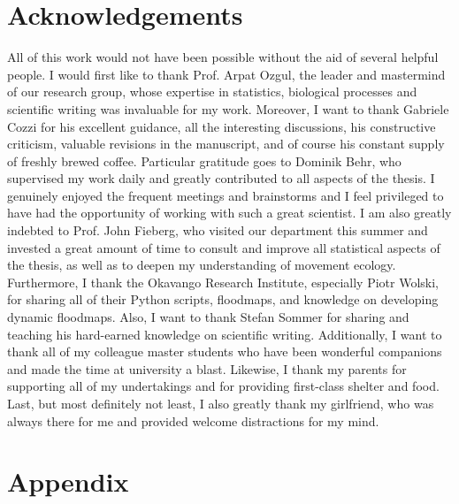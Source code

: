 \documentclass[abstract=on,10pt,a4paper,bibliography=totocnumbered]{scrartcl}
\begin{document}
\section{Acknowledgements}
All of this work would not have been possible without the aid of several helpful
people. I would first like to thank Prof. Arpat Ozgul, the leader and mastermind
of our research group, whose expertise in statistics, biological processes and
scientific writing was invaluable for my work. Moreover, I want to thank
Gabriele Cozzi for his excellent guidance, all the interesting discussions, his
constructive criticism, valuable revisions in the manuscript, and of course his
constant supply of freshly brewed coffee. Particular gratitude goes to Dominik
Behr, who supervised my work daily and greatly contributed to all aspects of the
thesis. I genuinely enjoyed the frequent meetings and brainstorms and I feel
privileged to have had the opportunity of working with such a great scientist. I
am also greatly indebted to Prof. John Fieberg, who visited our department this
summer and invested a great amount of time to consult and improve all
statistical aspects of the thesis, as well as to deepen my understanding of
movement ecology. Furthermore, I thank the Okavango Research Institute,
especially Piotr Wolski, for sharing all of their Python scripts, floodmaps, and
knowledge on developing dynamic floodmaps. Also, I want to thank Stefan Sommer
for sharing and teaching his hard-earned knowledge on scientific writing.
Additionally, I want to thank all of my colleague master students who have been
wonderful companions and made the time at university a blast. Likewise, I thank
my parents for supporting all of my undertakings and for providing first-class
shelter and food. Last, but most definitely not least, I also greatly thank my
girlfriend, who was always there for me and provided welcome distractions for my
mind.

\newpage
\begingroup
\singlespacing

\endgroup

\newpage
\appendix
\section{Appendix}
\end{document}
